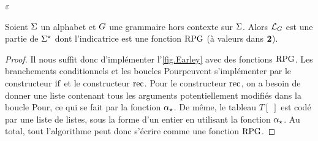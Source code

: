 \begin{algorithm}[!t]
  \KwRet $\varepsilon$\;
  \caption{Algorithme d'Earley \cite{Earley1970}}
  \label{fig.Earley}
\end{algorithm}

\begin{proposition}
  Soient $\Sigma$ un alphabet et $G$ une grammaire hors contexte sur $\Sigma$.
  Alors $\mathcal L_{G}$ est une partie de $\Sigma^{\star}$ dont l'indicatrice est
  une fonction $\operatorname{RPG}$ (à valeurs dans $\bm{2}$).
\end{proposition}

\begin{proof}
  Il nous suffit donc d'implémenter l'\cref{fig.Earley} avec des fonctions
  $\operatorname{RPG}$. Les branchements conditionnels et les boucles \og Pour\fg peuvent
  s'implémenter par le constructeur $\operatorname{if}$ et le constructeur $\operatorname{rec}$. Pour le
  constructeur $\operatorname{rec}$, on a besoin de donner une liste contenant tous les
  arguments potentiellement modifiés dans la boucle \og Pour\fg, ce qui se
  fait par la fonction $\alpha_{\star}$. De même, le tableau $T[\;]$ est codé par une
  liste de listes, sous la forme d'un entier en utilisant la fonction $\alpha_{\star}$.
  Au total, tout l'algorithme peut donc s'écrire comme une fonction $\operatorname{RPG}$.
\end{proof}

